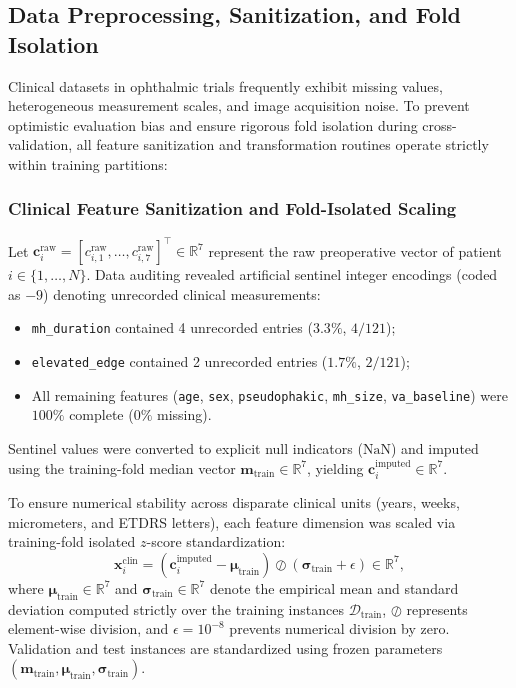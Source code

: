\documentclass[preprint,12pt]{elsarticle}
\begin{document}
\subsection{Data Preprocessing, Sanitization, and Fold Isolation}
\label{sec:preprocessing}
Clinical datasets in ophthalmic trials frequently exhibit missing values, heterogeneous measurement scales, and image acquisition noise. To prevent optimistic evaluation bias and ensure rigorous fold isolation during cross-validation, all feature sanitization and transformation routines operate strictly within training partitions:

\subsubsection{Clinical Feature Sanitization and Fold-Isolated Scaling}
Let $\mathbf{c}_i^{\text{raw}} = [c_{i,1}^{\text{raw}}, \dots, c_{i,7}^{\text{raw}}]^{\top} \in \mathbb{R}^7$ represent the raw preoperative vector of patient $i \in \{1, \dots, N\}$. Data auditing revealed artificial sentinel integer encodings (coded as $-9$) denoting unrecorded clinical measurements:
\begin{itemize}
    \item \texttt{mh\_duration} contained 4 unrecorded entries ($3.3\%$, $4/121$);
    \item \texttt{elevated\_edge} contained 2 unrecorded entries ($1.7\%$, $2/121$);
    \item All remaining features (\texttt{age}, \texttt{sex}, \texttt{pseudophakic}, \texttt{mh\_size}, \texttt{va\_baseline}) were $100\%$ complete ($0\%$ missing).
\end{itemize}
Sentinel values were converted to explicit null indicators ($\text{NaN}$) and imputed using the training-fold median vector $\bm{m}_{\text{train}} \in \mathbb{R}^7$, yielding $\mathbf{c}_i^{\text{imputed}} \in \mathbb{R}^7$. 

To ensure numerical stability across disparate clinical units (years, weeks, micrometers, and ETDRS letters), each feature dimension was scaled via training-fold isolated $z$-score standardization:
\begin{equation}
\mathbf{x}_i^{\text{clin}} = \left( \mathbf{c}_i^{\text{imputed}} - \bm{\mu}_{\text{train}} \right) \oslash \left( \bm{\sigma}_{\text{train}} + \epsilon \right) \in \mathbb{R}^7,
\end{equation}
where $\bm{\mu}_{\text{train}} \in \mathbb{R}^7$ and $\bm{\sigma}_{\text{train}} \in \mathbb{R}^7$ denote the empirical mean and standard deviation computed strictly over the training instances $\mathcal{D}_{\text{train}}$, $\oslash$ represents element-wise division, and $\epsilon = 10^{-8}$ prevents numerical division by zero. Validation and test instances are standardized using frozen parameters $(\bm{m}_{\text{train}}, \bm{\mu}_{\text{train}}, \bm{\sigma}_{\text{train}})$.
\end{document}
